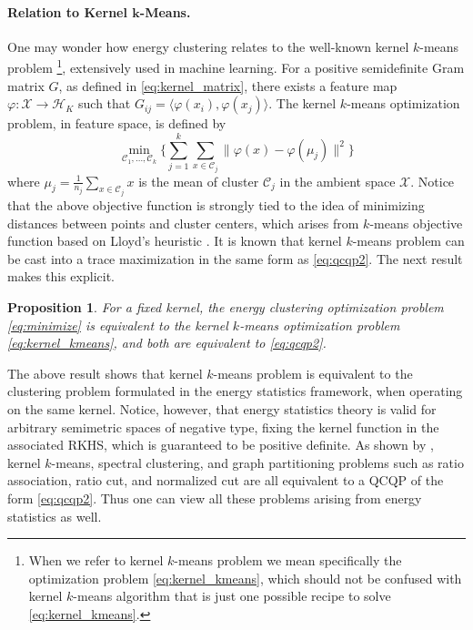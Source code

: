 \documentclass[twoside]{article}
\newtheorem{proposition}[theorem]{Proposition}
\newcommand\kk{K}
\newcommand\HH{\mathcal{H}}
\newcommand\C{{\mathcal{C}}}
\begin{document}
\paragraph{Relation to Kernel $\bm{k}$-Means.}
One may wonder how energy clustering 
relates to the well-known kernel $k$-means problem%
\footnote{When we refer to kernel $k$-means problem we mean specifically 
the optimization problem \eqref{eq:kernel_kmeans}, which should not be 
confused with kernel $k$-means algorithm that is just one possible recipe 
to solve \eqref{eq:kernel_kmeans}.}, 
extensively used in machine learning.
For a positive semidefinite Gram matrix $G$, as defined in
\eqref{eq:kernel_matrix},
there exists a feature map
$\varphi: \mathcal{X} \to \HH_\kk$ such that
$G_{ij} = \langle \varphi(x_i), \varphi(x_j) \rangle$. The kernel $k$-means optimization
problem,
in feature space,
is defined by
\begin{equation}
\label{eq:kernel_kmeans}
\min_{\C_1,\dotsc,\C_k}\bigg\{ 
\sum_{j=1}^k
\sum_{x \in \C_j} \| \varphi(x) - \varphi(\mu_j) \|^2
\bigg\}
\end{equation}
where $\mu_j = \tfrac{1}{n_j} \sum_{x \in \C_j} x$ is the  mean of cluster
$\C_j$ in the ambient space $\mathcal{X}$. 
Notice that the above objective function
is strongly tied to the idea of minimizing distances between points
and cluster centers, which arises from $k$-means objective function based
on Lloyd's heuristic \citep{Lloyd}.
It is known \citep{Dhillon2,Dhillon}
that kernel $k$-means problem 
can be cast into a trace maximization in the same form as 
\eqref{eq:qcqp2}. The next result makes this explicit.

\begin{proposition}
\label{th:kernel_kmeans}
For a fixed kernel,
the energy clustering optimization problem
\eqref{eq:minimize} 
is equivalent to the kernel $k$-means optimization problem
\eqref{eq:kernel_kmeans}, and both are equivalent to \eqref{eq:qcqp2}.
\end{proposition}

The above result shows that 
kernel $k$-means problem is equivalent to the clustering problem
formulated in the energy statistics framework, when operating on the same
kernel. Notice, however, that 
energy statistics theory is valid for arbitrary semimetric spaces of
negative type, fixing the kernel function in the associated RKHS, which
is guaranteed to be positive definite.
As shown by \citep{Dhillon2,Dhillon}, kernel $k$-means, spectral clustering,
and graph partitioning problems such as ratio association, ratio cut, and
normalized cut are all equivalent to a QCQP of the form \eqref{eq:qcqp2}.
Thus one can view all these problems arising from energy statistics as well.
\end{document}
